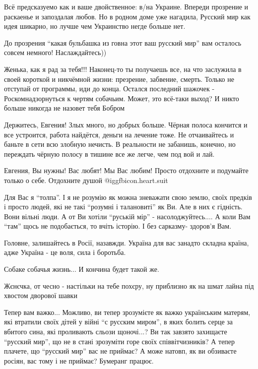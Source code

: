 \begin{itemize}

Всё предсказуемо как и ваше двойственное: в/на Украине. Впереди прозрение и
раскаенье и запоздалая любов. Но в родном доме уже нагадила, Русский мир как
идея шикарно, но лучше чем Украинство негде больше нет.


До прозрения \enquote{какая бульбашка из говна этот ваш русский мир} вам
осталось совсем немного! Наслаждайтесь))


Женька, как я рад за тебя!!! Наконец-то ты получаешь все, на что заслужила в
своей короткой и никчёмной жизни: презрение, забвение, смерть. Только не
отступай от программы, иди до конца. Остался последний шажочек -
Роскомнадзорнуться к чертям собачьим. Может, это всё-таки выход? И никто больше
никогда не назовет тебя Бобром


Держитесь, Евгения! Злых много, но добрых больше. Чёрная полоса кончится и все
устроится, работа найдётся, деньги на лечение тоже. Не отчаивайтесь и баньте в
сети всю злобную нечисть. В реальности не забанишь, конечно, но переждать
чёрную полосу в тишине все же легче, чем под вой и лай.

Евгения, Вы нужны! Вас любят! Мы Вас любим! Просто отдохните и подумайте только
о себе. Отдохните душой @igg{fbicon.heart.suit}


Для Вас я \enquote{толпа}. І я не розумію як можна зневажати свою землю, своїх предків і
просто людей, які не такі \enquote{розумні і талановиті} як Ви. Але в них є гідність.
Вони вільні люди. А от Ви хотіли \enquote{руській мір} - насолоджуйтесь.... А коли Вам
\enquote{там} щось не подобається, то вчіть історію. І без сарказму- здоров'я Вам.

Головне, залишайтесь в Росії, назавжди. Україна для вас занадто складна країна, адже Україна - це воля, сила і боротьба.

Собаке собачья жизнь... И кончина будет такой же.

Жєнєчка, от чесно - настільки на тебе похєру, ну приблизно як на шмат лайна під хвостом дворової шавки


Тепер вам важко... Можливо, ви тепер зрозумієте як важко українським матерям,
які втратили своїх дітей у війні \enquote{с русским миром}, в яких болить серце за
вбитого сина, які проливають сльози щоночі...? Ви так завзято захищаєте
\enquote{русский мир}, що не в стані зрозуміти горе своїх співвітчизників? А тепер
плачете, що \enquote{русский мир} вас не приймає? А може натовп, як ви обзиваєте
росіян, вас тому і не приймає? Бумеранг працює.


\end{itemize}
